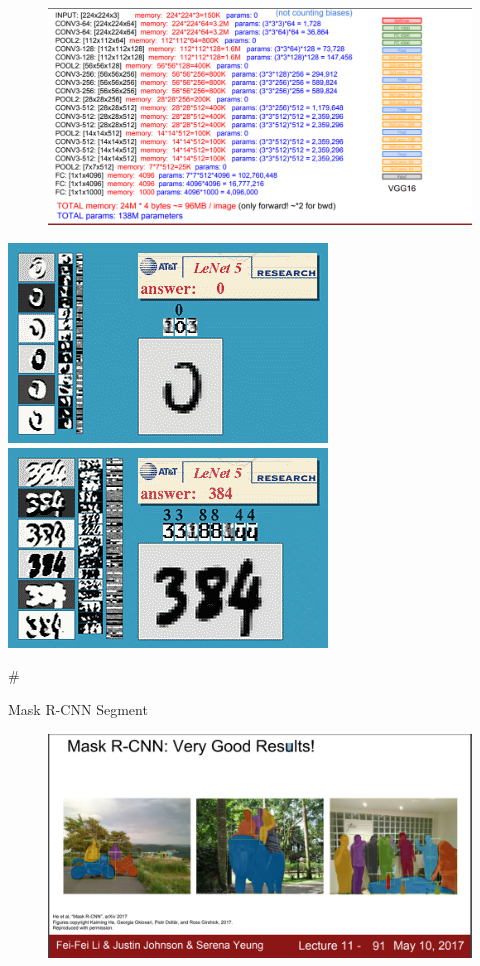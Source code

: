 \documentclass[11pt]{article}
\makeatletter
\def\maxwidth{\ifdim\Gin@nat@width>\linewidth\linewidth
    \else\Gin@nat@width\fi}
\let\Oldincludegraphics\includegraphics
\renewcommand{\includegraphics}[1]{\Oldincludegraphics[width=.8\maxwidth]{#1}}
\makeatother
\begin{document}
    \begin{figure}
\centering
\includegraphics{vgg16_para.png}
\caption{}
\end{figure}

    \includegraphics{asamples.gif} \includegraphics{a384.gif}

    \#

Mask R-CNN Segment

\begin{figure}
\centering
\includegraphics{r-cnn-segment.png}
\caption{}
\end{figure}
\end{document}
